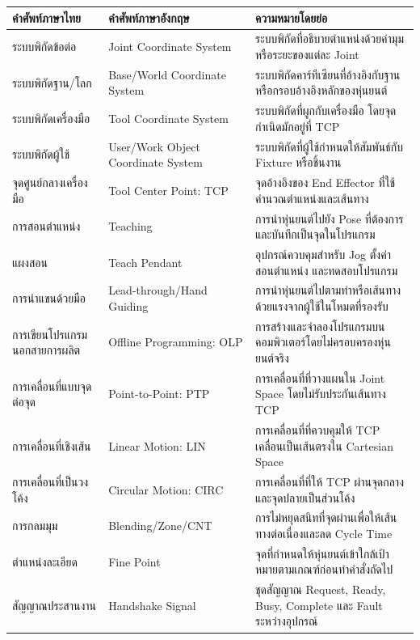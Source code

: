 \begin{table}[htbp]
    \centering
    \small
    \begin{tabularx}{\textwidth}{@{}L{0.22\textwidth}L{0.28\textwidth}Y@{}}
        \hline
        \textbf{คำศัพท์ภาษาไทย} & \textbf{คำศัพท์ภาษาอังกฤษ} & \textbf{ความหมายโดยย่อ} \\
        \hline
        ระบบพิกัดข้อต่อ & Joint Coordinate System & ระบบพิกัดที่อธิบายตำแหน่งด้วยค่ามุมหรือระยะของแต่ละ Joint \\
        ระบบพิกัดฐาน/โลก & Base/World Coordinate System & ระบบพิกัดคาร์ทีเซียนที่อ้างอิงกับฐานหรือกรอบอ้างอิงหลักของหุ่นยนต์ \\
        ระบบพิกัดเครื่องมือ & Tool Coordinate System & ระบบพิกัดที่ผูกกับเครื่องมือ โดยจุดกำเนิดมักอยู่ที่ TCP \\
        ระบบพิกัดผู้ใช้ & User/Work Object Coordinate System & ระบบพิกัดที่ผู้ใช้กำหนดให้สัมพันธ์กับ Fixture หรือชิ้นงาน \\
        จุดศูนย์กลางเครื่องมือ & Tool Center Point: TCP & จุดอ้างอิงของ End Effector ที่ใช้คำนวณตำแหน่งและเส้นทาง \\
        การสอนตำแหน่ง & Teaching & การนำหุ่นยนต์ไปยัง Pose ที่ต้องการและบันทึกเป็นจุดในโปรแกรม \\
        แผงสอน & Teach Pendant & อุปกรณ์ควบคุมสำหรับ Jog ตั้งค่า สอนตำแหน่ง และทดสอบโปรแกรม \\
        การนำแขนด้วยมือ & Lead-through/Hand Guiding & การนำหุ่นยนต์ไปตามท่าหรือเส้นทางด้วยแรงจากผู้ใช้ในโหมดที่รองรับ \\
        การเขียนโปรแกรมนอกสายการผลิต & Offline Programming: OLP & การสร้างและจำลองโปรแกรมบนคอมพิวเตอร์โดยไม่ครอบครองหุ่นยนต์จริง \\
        การเคลื่อนที่แบบจุดต่อจุด & Point-to-Point: PTP & การเคลื่อนที่ที่วางแผนใน Joint Space โดยไม่รับประกันเส้นทาง TCP \\
        การเคลื่อนที่เชิงเส้น & Linear Motion: LIN & การเคลื่อนที่ที่ควบคุมให้ TCP เคลื่อนเป็นเส้นตรงใน Cartesian Space \\
        การเคลื่อนที่เป็นวงโค้ง & Circular Motion: CIRC & การเคลื่อนที่ที่ให้ TCP ผ่านจุดกลางและจุดปลายเป็นส่วนโค้ง \\
        การกลมมุม & Blending/Zone/CNT & การไม่หยุดสนิทที่จุดผ่านเพื่อให้เส้นทางต่อเนื่องและลด Cycle Time \\
        ตำแหน่งละเอียด & Fine Point & จุดที่กำหนดให้หุ่นยนต์เข้าใกล้เป้าหมายตามเกณฑ์ก่อนทำคำสั่งถัดไป \\
        สัญญาณประสานงาน & Handshake Signal & ชุดสัญญาณ Request, Ready, Busy, Complete และ Fault ระหว่างอุปกรณ์ \\

\end{tabularx}
\end{table}
